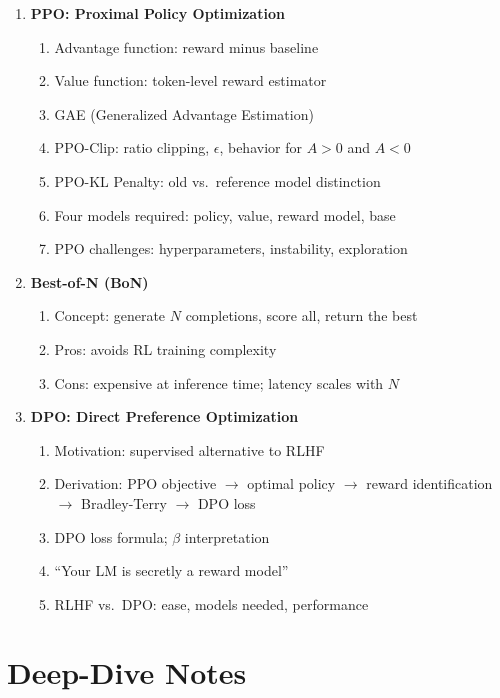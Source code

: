 \documentclass[11pt, a4paper]{article}
\begin{document}
\begin{enumerate}[label=\textbf{\arabic*.}, leftmargin=2em]
  \item \textbf{PPO: Proximal Policy Optimization}
    \begin{enumerate}[label=\arabic{enumi}.\arabic*]
      \item Advantage function: reward minus baseline
      \item Value function: token-level reward estimator
      \item GAE (Generalized Advantage Estimation)
      \item PPO-Clip: ratio clipping, $\epsilon$, behavior for $A > 0$ and $A < 0$
      \item PPO-KL Penalty: old vs.\ reference model distinction
      \item Four models required: policy, value, reward model, base
      \item PPO challenges: hyperparameters, instability, exploration
    \end{enumerate}

  \item \textbf{Best-of-N (BoN)}
    \begin{enumerate}[label=\arabic{enumi}.\arabic*]
      \item Concept: generate $N$ completions, score all, return the best
      \item Pros: avoids RL training complexity
      \item Cons: expensive at inference time; latency scales with $N$
    \end{enumerate}

  \item \textbf{DPO: Direct Preference Optimization}
    \begin{enumerate}[label=\arabic{enumi}.\arabic*]
      \item Motivation: supervised alternative to RLHF
      \item Derivation: PPO objective $\to$ optimal policy $\to$ reward identification $\to$ Bradley-Terry $\to$ DPO loss
      \item DPO loss formula; $\beta$ interpretation
      \item ``Your LM is secretly a reward model''
      \item RLHF vs.\ DPO: ease, models needed, performance
    \end{enumerate}
\end{enumerate}

\newpage
\section{Deep-Dive Notes}
\end{document}
